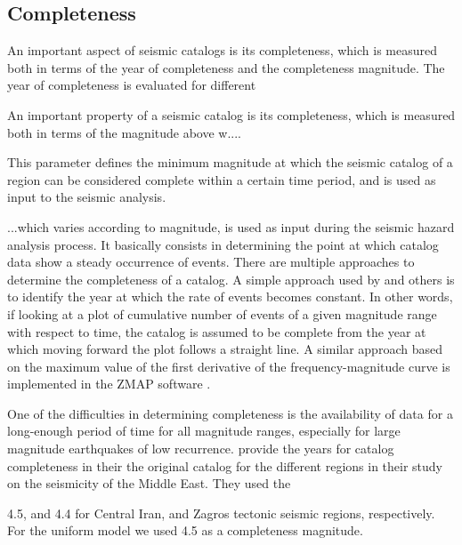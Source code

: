
\subsection{Completeness}

An important aspect of seismic catalogs is its completeness, which is measured both in terms of the year of completeness and the completeness magnitude. The year of completeness is evaluated for different 

An important property of a seismic catalog is its completeness, which is measured both in terms of the magnitude above w....

This parameter defines the minimum magnitude at which the seismic catalog of a region can be considered complete within a certain time period, and is used as input to the seismic analysis. 

...which varies according to magnitude, is used as input during the seismic hazard analysis process. It basically consists in determining the point at which catalog data show a steady occurrence of events. There are multiple approaches to determine the completeness of a catalog. A simple approach used by \citet{Frankel1995} and others is to identify the year at which the rate of events becomes constant. In other words, if looking at a plot of cumulative number of events of a given magnitude range with respect to time, the catalog is assumed to be complete from the year at which moving forward the plot follows a straight line. A similar approach based on the maximum value of the first derivative of the frequency-magnitude curve is implemented in the ZMAP software \citep{Wiemer2001}.

One of the difficulties in determining completeness is the availability of data for a long-enough period of time for all magnitude ranges, especially for large magnitude earthquakes of low recurrence. \citet{Zare} provide the years for catalog completeness in their the original catalog for the different regions in their study on the seismicity of the Middle East. They used the 



4.5, and 4.4 for 
Central Iran, and Zagros tectonic seismic regions, respectively. For the uniform model we used 4.5 as a completeness magnitude.



